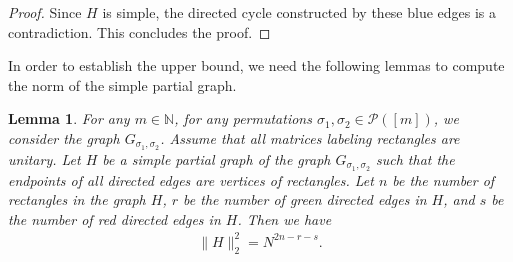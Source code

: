 \documentclass[12pt]{article}
\numberwithin{equation}{section}
\theoremstyle{plain}
\newtheorem{lemma}[theorem]{Lemma}
\def\bN{\mathbb N}
\def\cP{\mathcal P}
\begin{document}
\begin{proof}
Since $H$ is simple, the directed cycle constructed by these blue edges is a contradiction. This concludes the proof.
\end{proof}

In order to establish the upper bound, we need the following lemmas to compute the norm of the simple partial graph.

\begin{lemma} \label{Lem-inner product}
For any $m \in \bN$, for any permutations $\sigma_1,\sigma_2 \in \cP([m])$, we consider the graph $G_{\sigma_1,\sigma_2}$. Assume that all matrices labeling rectangles are unitary. Let $H$ be a simple partial graph of the graph $G_{\sigma_1,\sigma_2}$ such that the endpoints of all directed edges are vertices of rectangles. Let $n$ be the number of rectangles in the graph $H$, $r$ be the number of green directed edges in $H$, and $s$ be the number of red directed edges in $H$. Then we have
\begin{align*}
    \|H\|_2^2 = N^{2n-r-s}.
\end{align*}
\end{lemma}
\end{document}
